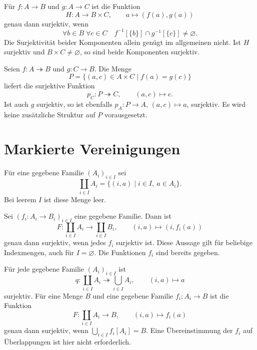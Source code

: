 \begin{theorem}
\label{b07guide:thm:pairing}
Für $f\colon A\to B$ und $g\colon A\to C$ ist die Funktion
\[
 H\colon A\to B\times C,\qquad a\mapsto(f(a),g(a))
\]
genau dann surjektiv, wenn
\[
 \forall b\in B\;\forall c\in C\quad
 f^{-1}[\{b\}]\cap g^{-1}[\{c\}]\ne\varnothing.
\]
Die Surjektivität beider Komponenten allein genügt im allgemeinen
nicht. Ist $H$ surjektiv und $B\times C\ne\varnothing$,
so sind beide Komponenten surjektiv.
\end{theorem}

\begin{theorem}
\label{b07guide:thm:basechange}
Seien $f\colon A\twoheadrightarrow B$ und $g\colon C\to B$.
Die Menge
\[
 P=\{(a,c)\in A\times C\mid f(a)=g(c)\}
\]
liefert die surjektive Funktion
\[
 p_C\colon P\twoheadrightarrow C,\qquad (a,c)\mapsto c.
\]
Ist auch $g$ surjektiv, so ist ebenfalls
$p_A\colon P\to A$, $(a,c)\mapsto a$, surjektiv.
Es wird keine zusätzliche Struktur auf $P$ vorausgesetzt.
\end{theorem}

\section{Markierte Vereinigungen}

\begin{definition}
Für eine gegebene Familie $(A_i)_{i\in I}$ sei
\[
 \coprod_{i\in I}A_i=\{(i,a)\mid i\in I,\ a\in A_i\}.
\]
Bei leerem $I$ ist diese Menge leer.
\end{definition}

\begin{theorem}
\label{b07guide:thm:taggedunion}
Sei $(f_i\colon A_i\to B_i)_{i\in I}$ eine gegebene Familie.
Dann ist
\[
 F\colon\coprod_{i\in I}A_i\longrightarrow\coprod_{i\in I}B_i,
 \qquad(i,a)\mapsto(i,f_i(a))
\]
genau dann surjektiv, wenn jedes $f_i$ surjektiv ist.
Diese Aussage gilt für beliebige Indexmengen, auch für
$I=\varnothing$. Die Funktionen $f_i$ sind bereits gegeben.
\end{theorem}

\begin{theorem}
\label{b07guide:thm:forgettags}
Für jede gegebene Familie $(A_i)_{i\in I}$ ist
\[
 q\colon\coprod_{i\in I}A_i\twoheadrightarrow\bigcup_{i\in I}A_i,
 \qquad(i,a)\mapsto a
\]
surjektiv. Für eine Menge $B$ und eine gegebene Familie
$f_i\colon A_i\to B$ ist die Funktion
\[
 F\colon\coprod_{i\in I}A_i\to B,\qquad(i,a)\mapsto f_i(a)
\]
genau dann surjektiv, wenn
$\bigcup_{i\in I}f_i[A_i]=B$.
Eine Übereinstimmung der $f_i$ auf Überlappungen ist hier
nicht erforderlich.
\end{theorem}

